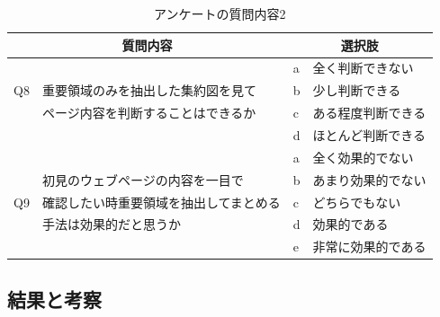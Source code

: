 \begin{table}[H]
    \caption{アンケートの質問内容2}
    \label{table:question02}
    \centering
    \begingroup
    \renewcommand{\arraystretch}{1} %
    \small
    \begin{tabular}{|l|l|l|l|}
        \hline
        \multicolumn{2}{|c|}{質問内容} & \multicolumn{2}{|c|}{選択肢} \\ \hline
        & & a & 全く判断できない \\ \cline{3-4}
        Q8 & 重要領域のみを抽出した集約図を見て & b & 少し判断できる \\ \cline{3-4}
        & ページ内容を判断することはできるか & c & ある程度判断できる \\ \cline{3-4}
        & & d & ほとんど判断できる \\ \hline
        & & a & 全く効果的でない \\ \cline{3-4}
        & 初見のウェブページの内容を一目で & b & あまり効果的でない \\ \cline{3-4}
        Q9 & 確認したい時重要領域を抽出してまとめる & c & どちらでもない \\ \cline{3-4}
        & 手法は効果的だと思うか & d & 効果的である \\ \cline{3-4}
        & & e & 非常に効果的である \\ \hline
        \end{tabular}
        \endgroup
\end{table}


\subsection{結果と考察}
